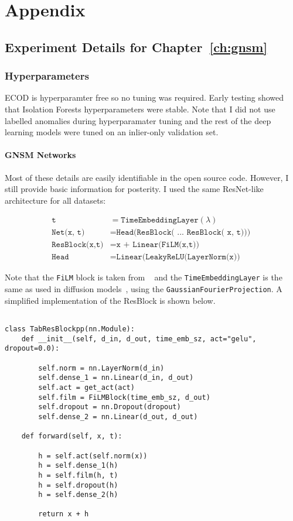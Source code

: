\chapter{Appendix}

\section{Experiment Details for Chapter~\ref{ch:gnsm}}

\subsection*{Hyperparameters}
ECOD is hyperparamter free so no tuning was required. Early testing showed that Isolation Forests hyperparameters were stable. Note that I did not use labelled anomalies during hyperparamater tuning and the rest of the deep learning models were tuned on an inlier-only validation set.

\subsubsection*{GNSM Networks}

Most of these details are easily identifiable in the open source code. However, I still provide basic information for posterity. I used the same ResNet-like architecture for all datasets:

\begin{align}
    \texttt{t} &= \texttt{TimeEmbeddingLayer}(\lambda) \\
    \texttt{Net(x, t)} &= \texttt{Head(ResBlock( ... ResBlock( x, t))) } \\
    \texttt{ResBlock(x,t)} &= \texttt{x + Linear(FiLM(x,t))} \\
    \texttt{Head} &= \texttt{Linear(LeakyReLU(LayerNorm(x))}
\end{align}

Note that the \texttt{FiLM} block is taken from ~\cite{perez2018film} and the \texttt{TimeEmbeddingLayer} is the same as used in diffusion models~\cite{song2020score}, using the \texttt{GaussianFourierProjection}.
A simplified implementation of the ResBlock is shown below.

\begin{verbatim}

class TabResBlockpp(nn.Module):
    def __init__(self, d_in, d_out, time_emb_sz, act="gelu", dropout=0.0):
    
        self.norm = nn.LayerNorm(d_in)
        self.dense_1 = nn.Linear(d_in, d_out)
        self.act = get_act(act)
        self.film = FiLMBlock(time_emb_sz, d_out)
        self.dropout = nn.Dropout(dropout)
        self.dense_2 = nn.Linear(d_out, d_out)

    def forward(self, x, t):
        
        h = self.act(self.norm(x))
        h = self.dense_1(h)
        h = self.film(h, t)
        h = self.dropout(h)
        h = self.dense_2(h)

        return x + h
\end{verbatim}

